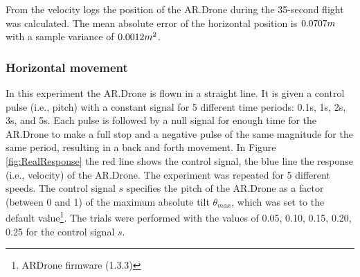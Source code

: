 From the velocity logs the position of the AR.Drone during the 35-second 
flight was calculated. 
The mean absolute error of the horizontal position is $0.0707\small{m}$ with a sample variance of $0.0012\small{m^2}$.

\subsubsection{Horizontal movement}

In this experiment the AR.Drone is flown in a straight line. It is given a control pulse (i.e., pitch) with a constant signal
for 5 different time periods: 0.1s, 1s, 2s, 3s, and 5s. Each pulse is followed by a null signal for enough time for the AR.Drone to make a full stop and a negative pulse of the same magnitude for the same period,
resulting in a back and forth movement. In Figure \ref{fig:RealResponse}
 the red line shows the control signal, the blue line the response (i.e., velocity) of the AR.Drone. The experiment was repeated for 5 different speeds.
The control signal $s$ specifies the pitch of the AR.Drone as a factor (between 0 and 1) of the maximum absolute tilt $\theta_{max}$, which was set to the default value\footnote{ARDrone firmware (1.3.3)}. %
The trials were performed with the
values of 0.05, 0.10, 0.15, 0.20, 0.25 for the control signal $s$.

